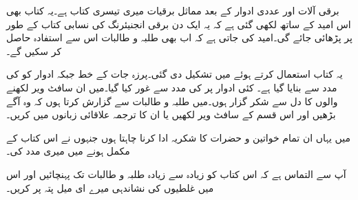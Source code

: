 \thispagestyle{empty}
برقی آلات اور عددی ادوار کے بعد مماثل برقیات میری تیسری کتاب ہے۔یہ کتاب بھی اس امید کے ساتھ لکھی گئی ہے کہ یہ ایک دن برقی انجنیئرنگ کی نسابی کتاب کے طور پر پڑھائی جائے گی۔امید کی جاتی ہے کہ اب بھی طلبہ و طالبات اس سے استفادہ حاصل کر سکیں گے۔

یہ کتاب  استعمال  کرتے ہوئے  میں تشکیل دی گئی۔پرزہ جات کے خط  جبکہ ادوار کو  کی مدد سے بنایا گیا ہے۔ کئی ادوار پر  کی مدد سے غور کیا گیا۔میں ان سافٹ ویر لکھنے والوں کا دل سے شکر گزار ہوں۔میں طلبہ و طالبات سے گزارش  کرتا ہوں کہ وہ آگے بڑھیں اور اس قسم کے سافٹ ویر لکھیں یا ان کا ترجمہ علاقائی زبانوں میں کریں۔

میں یہاں ان تمام خواتین و حضرات کا شکریہ ادا کرنا چاہتا ہوں جنہوں نے اس کتاب کے مکمل ہونے میں میری مدد کی۔ 

آپ سے التماس ہے کہ اس کتاب کو زیادہ سے زیادہ طلبہ و طالبات تک پہنچائیں اور اس میں غلطیوں کی نشاندہی میرے ای میل پتہ پر کریں۔
\vspace{5mm}

{}
